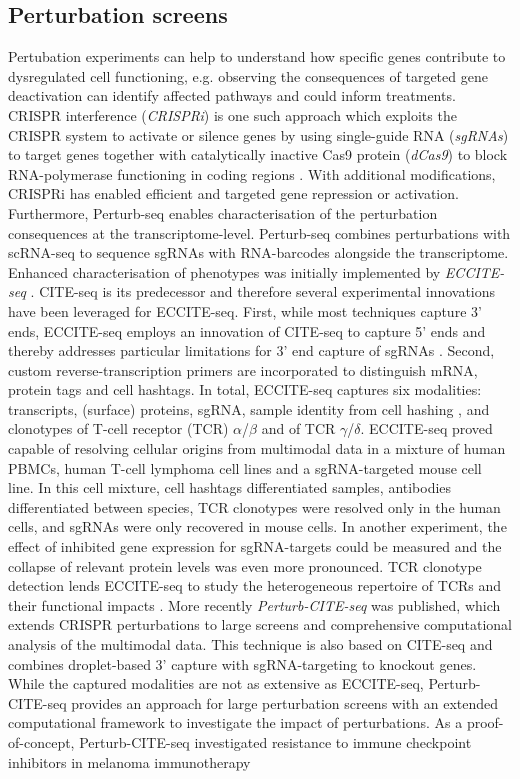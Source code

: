 \documentclass[times, twoside, watermark]{zHenriquesLab-StyleBioRxiv}
\begin{document}
\subsection*{Perturbation screens} Pertubation experiments can help to understand how specific genes contribute to dysregulated cell functioning, e.g. observing the consequences of targeted gene deactivation can identify affected pathways and could inform treatments. CRISPR interference (\textit{CRISPRi}) is one such approach which exploits the CRISPR system to activate or silence genes by using single-guide RNA (\textit{sgRNAs}) to target genes together with catalytically inactive Cas9 protein (\textit{dCas9}) to block RNA-polymerase functioning in coding regions \cite{Gilbert2013}. With additional modifications, CRISPRi has enabled efficient and targeted gene repression or activation. Furthermore, Perturb-seq \cite{Adamson2016,Dixit2016} enables characterisation of the perturbation consequences at the transcriptome-level. Perturb-seq combines perturbations with scRNA-seq to sequence sgRNAs with RNA-barcodes alongside the transcriptome. \newline Enhanced characterisation of phenotypes was initially implemented by \textit{ECCITE-seq} \cite{Mimitou2019}. CITE-seq is its predecessor and therefore several experimental innovations have been leveraged for ECCITE-seq. First, while most techniques capture 3' ends, ECCITE-seq employs an innovation of CITE-seq to capture 5' ends and thereby addresses particular limitations for 3’ end capture of sgRNAs \cite{Mimitou2019}. Second, custom reverse-transcription primers are incorporated to distinguish mRNA, protein tags and cell hashtags. In total, ECCITE-seq captures six modalities: transcripts, (surface) proteins, sgRNA, sample identity from cell hashing \cite{Stoeckius2018}, and clonotypes of T-cell receptor (TCR) $\alpha$/$\beta$ and of TCR $\gamma$/$\delta$. ECCITE-seq proved capable of resolving cellular origins from multimodal data in a mixture of human PBMCs, human T-cell lymphoma cell lines and a sgRNA-targeted mouse cell line. In this cell mixture, cell hashtags differentiated samples, antibodies differentiated between species, TCR clonotypes were resolved only in the human cells, and sgRNAs were only recovered in mouse cells. In another experiment, the effect of inhibited gene expression for sgRNA-targets could be measured and the collapse of relevant protein levels was even more pronounced. TCR clonotype detection lends ECCITE-seq to study the heterogeneous repertoire of TCRs and their functional impacts \cite{Nathan2019,Zhang2021}. \newline More recently \textit{Perturb-CITE-seq} \cite{Frangieh2021} was published, which extends CRISPR perturbations to large screens and comprehensive computational analysis of the multimodal data. This technique is also based on CITE-seq and combines droplet-based 3’ capture with sgRNA-targeting to knockout genes. While the captured modalities are not as extensive as ECCITE-seq, Perturb-CITE-seq provides an approach for large perturbation screens with an extended computational framework to investigate the impact of perturbations. As a proof-of-concept, Perturb-CITE-seq investigated resistance to immune checkpoint inhibitors in melanoma immunotherapy 
\end{document}
